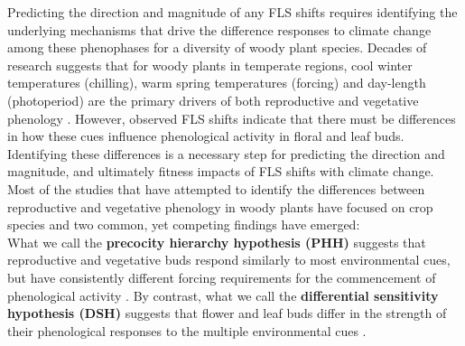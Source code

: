 \documentclass[11pt]{article}
\begin{document}
Predicting the direction and magnitude of any FLS shifts requires identifying the underlying mechanisms that drive the difference responses to climate change among these phenophases for a diversity of woody plant species. %
Decades of research suggests that for woody plants in temperate regions, cool winter temperatures (chilling), warm spring temperatures (forcing) and day-length (photoperiod) are the primary drivers of both reproductive and vegetative phenology \citep{Forrest2018,Flynn2018}. However, observed FLS shifts indicate that there must be differences in how these cues influence phenological activity in floral and leaf buds.%
Identifying these differences is a necessary step for predicting the direction and magnitude, and ultimately fitness impacts of FLS shifts with climate change.\\
 
\noindent Most of the studies that have attempted to identify the differences between reproductive and vegetative phenology in woody plants have focused on crop species and two common, yet competing findings have emerged:\\

\noindent What we call the \textbf{precocity hierarchy hypothesis (PHH)} suggests that reproductive and vegetative buds respond similarly to most environmental cues, but have consistently different forcing requirements for the commencement of phenological activity \citep{Guo_2014,COSMULESCU:2020aa,Cosmulescu:2018aa}. By contrast, what we call the \textbf{differential sensitivity hypothesis (DSH)} suggests that flower and leaf buds differ in the strength of their phenological responses to the multiple environmental cues \citep{Citadin2001,Gariglio2006,Crepinsek2011,Aslani2009,Mehlenbacher:1991aa}. \\
\end{document}
